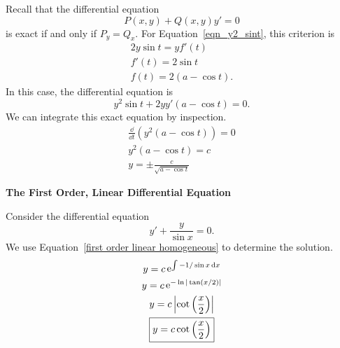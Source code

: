{  %
  \begin{Solution}
    \label{solution y2 sin t + y f dydt}
    Recall that the differential equation
    \[
    P(x, y) + Q(x, y) y' = 0
    \]
    is exact if and only if $P_y = Q_x$.
    For Equation~\ref{eqn_y2_sint}, this criterion is 
    \begin{gather*}
      2 y \sin t = y f'(t) \\
      f'(t) = 2 \sin t \\
      \boxed{
        f(t) = 2(a - \cos t).
        }
    \end{gather*}
    In this case, the differential equation is
    \[
    y^2 \sin t + 2 y y' (a - \cos t) = 0.
    \]
    We can integrate this exact equation by inspection.
    \begin{gather*}
      \frac{\dd}{\dd t} \left( y^2 (a - \cos t) \right) = 0 \\
      y^2 (a - \cos t) = c \\
      \boxed{
        y = \pm \frac{c}{ \sqrt{ a - \cos t } }
        }
    \end{gather*}
  \end{Solution}









  \begin{large}
    \noindent
    \textbf{The First Order, Linear Differential Equation}
  \end{large}





  \begin{Solution}
    \label{solution y + y / sin x}
    Consider the differential equation
    \[ 
    y' + \frac{y}{\sin x} = 0. 
    \]
    We use Equation~\ref{first order linear homogeneous} to determine 
    the solution.
    \begin{gather*}
      y = c \mathop{\mathrm{e}}\nolimits^{ \int -1/\sin x \,\mathrm{d} x } 
      \\
      y = c \mathop{\mathrm{e}}\nolimits^{ - \ln | \tan (x/2) | } 
      \\
      y = c \left| \cot \left( \frac{x}{2} \right) \right| 
      \\
      \boxed{ 
        y = c \cot \left( \frac{x}{2} \right)
        } 
    \end{gather*}
  \end{Solution}












}
